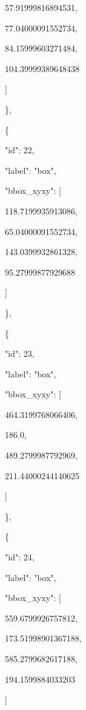 \documentclass[10pt,a4paper]{article}
\begin{document}
        57.91999816894531,\allowbreak{}\par
        77.04000091552734,\allowbreak{}\par
        84.15999603271484,\allowbreak{}\par
        104.39999389648438\par
      ]\par
    \},\allowbreak{}\par
    \{\par
      "id":\allowbreak{} 22,\allowbreak{}\par
      "label":\allowbreak{} "box",\allowbreak{}\par
      "bbox\_xyxy":\allowbreak{} [\par
        118.7199935913086,\allowbreak{}\par
        65.04000091552734,\allowbreak{}\par
        143.0399932861328,\allowbreak{}\par
        95.27999877929688\par
      ]\par
    \},\allowbreak{}\par
    \{\par
      "id":\allowbreak{} 23,\allowbreak{}\par
      "label":\allowbreak{} "box",\allowbreak{}\par
      "bbox\_xyxy":\allowbreak{} [\par
        464.3199768066406,\allowbreak{}\par
        186.0,\allowbreak{}\par
        489.2799987792969,\allowbreak{}\par
        211.44000244140625\par
      ]\par
    \},\allowbreak{}\par
    \{\par
      "id":\allowbreak{} 24,\allowbreak{}\par
      "label":\allowbreak{} "box",\allowbreak{}\par
      "bbox\_xyxy":\allowbreak{} [\par
        559.6799926757812,\allowbreak{}\par
        173.51998901367188,\allowbreak{}\par
        585.2799682617188,\allowbreak{}\par
        194.1599884033203\par
      ]\par
\end{document}
